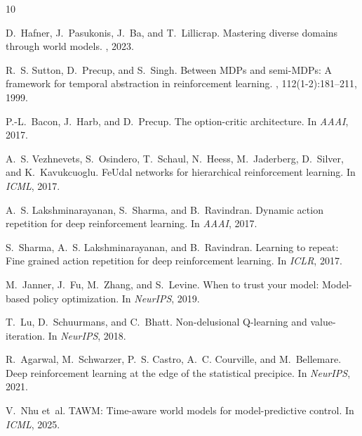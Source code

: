 \documentclass[10pt,letterpaper]{article}
\begin{document}

\begin{thebibliography}{10}

D.~Hafner, J.~Pasukonis, J.~Ba, and T.~Lillicrap.
\newblock Mastering diverse domains through world models.
, 2023.

R.~S. Sutton, D.~Precup, and S.~Singh.
\newblock Between MDPs and semi-MDPs: A framework for temporal abstraction in reinforcement learning.
, 112(1-2):181--211, 1999.

P.-L.~Bacon, J.~Harb, and D.~Precup.
\newblock The option-critic architecture.
\newblock In {\em AAAI}, 2017.

A.~S. Vezhnevets, S.~Osindero, T.~Schaul, N.~Heess, M.~Jaderberg, D.~Silver, and K.~Kavukcuoglu.
\newblock FeUdal networks for hierarchical reinforcement learning.
\newblock In {\em ICML}, 2017.

A.~S. Lakshminarayanan, S.~Sharma, and B.~Ravindran.
\newblock Dynamic action repetition for deep reinforcement learning.
\newblock In {\em AAAI}, 2017.

S.~Sharma, A.~S. Lakshminarayanan, and B.~Ravindran.
\newblock Learning to repeat: Fine grained action repetition for deep reinforcement learning.
\newblock In {\em ICLR}, 2017.

M.~Janner, J.~Fu, M.~Zhang, and S.~Levine.
\newblock When to trust your model: Model-based policy optimization.
\newblock In {\em NeurIPS}, 2019.

T.~Lu, D.~Schuurmans, and C.~Bhatt.
\newblock Non-delusional Q-learning and value-iteration.
\newblock In {\em NeurIPS}, 2018.

R.~Agarwal, M.~Schwarzer, P.~S. Castro, A.~C. Courville, and M.~Bellemare.
\newblock Deep reinforcement learning at the edge of the statistical precipice.
\newblock In {\em NeurIPS}, 2021.

V.~Nhu et~al.
\newblock TAWM: Time-aware world models for model-predictive control.
\newblock In {\em ICML}, 2025.

\end{thebibliography}
\end{document}
